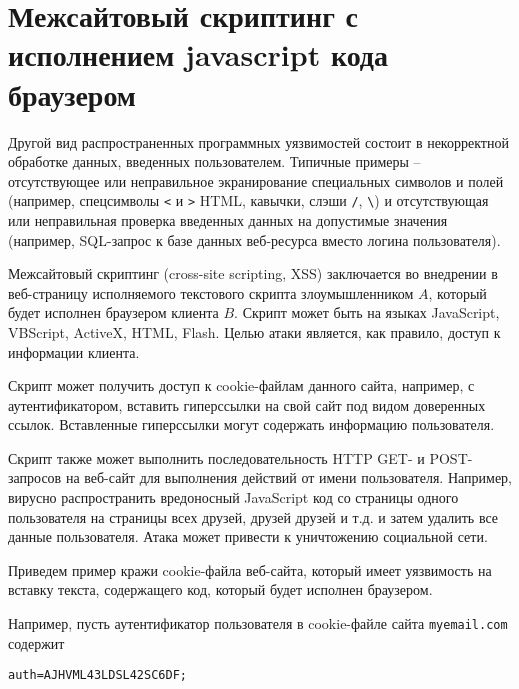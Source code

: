 \section[XSS-атака с исполнением кода браузером]{Межсайтовый скриптинг с \protect\\ исполнением javascript кода \protect\\ браузером}

Другой вид распространенных программных уязвимостей состоит в некорректной обработке данных, введенных пользователем. Типичные примеры -- отсутствующее или неправильное экранирование специальных символов и полей (например, спецсимволы \texttt{<} и \texttt{>} HTML, кавычки, слэши \texttt{/}, \texttt{\textbackslash}) и отсутствующая или неправильная проверка введенных данных на допустимые значения (например, SQL-запрос к базе данных веб-ресурса вместо логина пользователя).

Межсайтовый скриптинг (cross-site scripting, XSS) заключается во внедрении в веб-страницу исполняемого текстового скрипта злоумышленником $A$, который будет исполнен браузером клиента $B$. Скрипт может быть на языках JavaScript, VBScript, ActiveX, HTML, Flash. Целью атаки является, как правило, доступ к информации клиента.

Скрипт может получить доступ к cookie-файлам данного сайта, например, с аутентификатором, вставить гиперссылки на свой сайт под видом доверенных ссылок. Вставленные гиперссылки могут содержать информацию пользователя.

Скрипт также может выполнить последовательность HTTP GET- и POST-запросов на веб-сайт для выполнения действий от имени пользователя. Например, вирусно распространить вредоносный JavaScript код со страницы одного пользователя на страницы всех друзей, друзей друзей и т.д. и затем удалить все данные пользователя. Атака может привести к уничтожению социальной сети.

Приведем пример кражи cookie-файла веб-сайта, который имеет уязвимость на вставку текста, содержащего код, который будет исполнен браузером.


Например, пусть аутентификатор пользователя в cookie-файле сайта \texttt{myemail.com} содержит
\begin{center} \begin{verbatim}
auth=AJHVML43LDSL42SC6DF;
\end{verbatim} \end{center}

